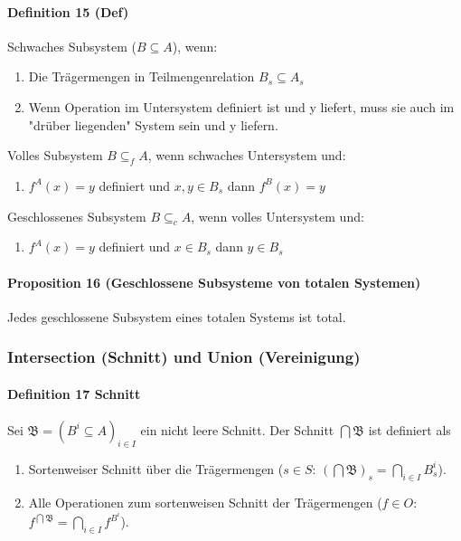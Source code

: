 \paragraph{Definition 15 (Def)} 

Schwaches Subsystem ($B \subseteq A$), wenn:
\begin{enumerate}
\item Die Trägermengen in Teilmengenrelation $B_s \subseteq A_s$
\item Wenn Operation im Untersystem definiert ist und y liefert, muss sie auch im "drüber liegenden" System sein und y liefern.
\end{enumerate}

Volles Subsystem $B \subseteq_f A$, wenn schwaches Untersystem und: \\
\begin{enumerate}
\item $f^A(x)=y$ definiert und $x,y \in B_s$ dann $f^B(x)=y$
\end{enumerate}

Geschlossenes Subsystem $B \subseteq_c A$, wenn volles Untersystem und: \\
\begin{enumerate}
\item  $f^A(x)=y$ definiert und $x \in B_s$ dann $y \in B_s$
\end{enumerate}

\paragraph{Proposition 16 (Geschlossene Subsysteme von totalen Systemen)}
Jedes geschlossene Subsystem eines totalen Systems ist total.

\subsubsection{Intersection (Schnitt) und Union (Vereinigung)}

\paragraph{Definition 17 Schnitt}
Sei $\mathfrak{B}=\left(B^{i}\subseteq A\right)_{i\in I}$ ein nicht leere Schnitt.
Der Schnitt $\bigcap\mathfrak{B}$ ist definiert als 
\begin{enumerate}
\item Sortenweiser Schnitt über die Trägermengen ($s\in S$: $\left(\bigcap\mathfrak{B}\right)_{s}=\bigcap_{i\in I}B_{s}^{i}$).
\item Alle Operationen zum sortenweisen Schnitt der Trägermengen ($f\in O$: $f^{\bigcap\mathfrak{B}}=\bigcap_{i\in I}f^{B^{i}}$).
\end{enumerate}

